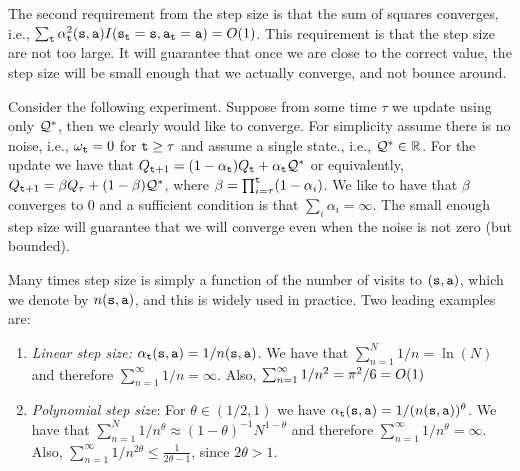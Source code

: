 The second requirement from the step size is that the sum of squares
converges, i.e., $\sum_{\tt t} \alpha_{\tt t}^2({\tt s},{\tt a})
I({\tt s}_{\tt t}={\tt s},{\tt a}_{\tt t}={\tt a})=O(1)$. This
requirement is that the step size are not too large. It will
guarantee that once we are close to the correct value, the step size
will be small enough that we actually converge, and not bounce
around.

Consider the following experiment. Suppose from some time $\tau$
we update using only $\mathcal{Q}^*$, then we clearly would like to converge.
For simplicity assume there is no noise, i.e., $\omega_{\tt t}=0$ for
${\tt t}\geq\tau$ and assume a single state., i.e., $\mathcal{Q}^*\in \mathbb{R}$.
For the update we have that $Q_{{\tt t}+1}=(1-\alpha_{\tt t})Q_{\tt t}
+\alpha_{\tt t} \mathcal{Q}^*$ or equivalently, $Q_{{\tt t}+1}=\beta
Q_\tau+(1-\beta)\mathcal{Q}^*$, where $\beta=
\prod_{i=\tau}^{\tt t}(1-\alpha_i)$. We like to have that $\beta$
converges to $0$ and a sufficient condition is that
$\sum_i\alpha_i=\infty$.
%
%
%
The small enough step size will guarantee that we will converge even
when the noise is not zero (but bounded).

Many times step size is simply a function of the number of visits
to $({\tt s},{\tt a})$, which we denote by $n({\tt s},{\tt a})$, and
this is widely used in practice. Two leading examples are:
\begin{enumerate}
\item
{\em Linear step size:}
$\alpha_{\tt t}({\tt s},{\tt a})=1/n({\tt s},{\tt a})$. We have that
$\sum_{n=1}^N 1/n=\ln(N)$ and therefore $\sum_{n=1}^\infty
1/n=\infty$. Also, $\sum_{n=1}^\infty 1/n^2=\pi^2/6=O(1)$
\item
{\em Polynomial step size}: For $\theta\in(1/2,1)$ we have
$\alpha_{\tt t}({\tt s},{\tt a})=1/(n({\tt s},{\tt a}))^\theta$. We
have that $\sum_{n=1}^N 1/n^\theta\approx
(1-\theta)^{-1}N^{1-\theta}$ and therefore $\sum_{n=1}^\infty
1/n^\theta=\infty$. Also, $\sum_{n=1}^\infty 1/n^{2\theta} \leq
\frac{1}{2\theta-1}$, since $2\theta>1$.
\end{enumerate}

